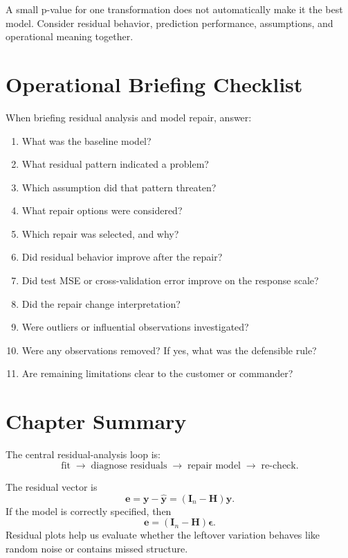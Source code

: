 {A small p-value for one transformation does not automatically make it the best model.  Consider residual behavior, prediction performance, assumptions, and operational meaning together.

\section{Operational Briefing Checklist}

When briefing residual analysis and model repair, answer:
\begin{enumerate}
  \item What was the baseline model?
  \item What residual pattern indicated a problem?
  \item Which assumption did that pattern threaten?
  \item What repair options were considered?
  \item Which repair was selected, and why?
  \item Did residual behavior improve after the repair?
  \item Did test MSE or cross-validation error improve on the response scale?
  \item Did the repair change interpretation?
  \item Were outliers or influential observations investigated?
  \item Were any observations removed?  If yes, what was the defensible rule?
  \item Are remaining limitations clear to the customer or commander?
\end{enumerate}

\section{Chapter Summary}

The central residual-analysis loop is:
\begin{equation}
  \boxed{
  \text{fit} \;\longrightarrow\; \text{diagnose residuals} \;\longrightarrow\; \text{repair model} \;\longrightarrow\; \text{re-check}.
  }
\end{equation}

The residual vector is
\begin{equation}
  \mathbf{e}=\mathbf{y}-\widehat{\mathbf{y}}=(\mathbf{I}_n-\mathbf{H})\mathbf{y}.
\end{equation}
If the model is correctly specified, then
\begin{equation}
  \mathbf{e}=(\mathbf{I}_n-\mathbf{H})\boldsymbol{\epsilon}.
\end{equation}
Residual plots help us evaluate whether the leftover variation behaves like random noise or contains missed structure.

}
